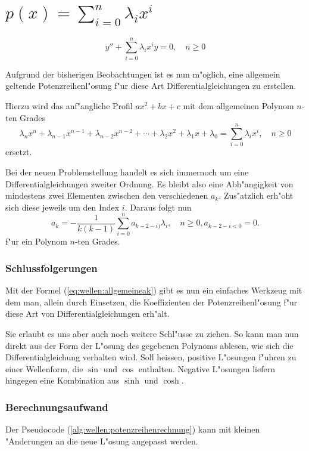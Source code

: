 \section{\texorpdfstring{$p(x) = \sum_{i=0}^{n}\lambda_ix^i$}{p(x) = summe i = 
0 
bis n lambdai xi}}

\begin{equation}
	y''+\sum_{i=0}^{n}\lambda_ix^i y=0, \quad n \ge 0
	\label{eq:wellen:allgemeinesproblem}
\end{equation}

Aufgrund der bisherigen Beobachtungen ist es nun m"oglich, eine 
allgemein geltende Potenzreihenl"osung f"ur diese Art Differentialgleichungen 
zu erstellen.

Hierzu wird das anf"angliche Profil $ax^2 + bx + c$ mit dem allgemeinen Polynom 
$n$-ten Grades
\begin{equation*}
	\lambda_nx^n + \lambda_{n-1}x^{n-1} + \lambda_{n-2}x^{n-2} + \dotsb + 
	\lambda_2x^2 + \lambda_1x + \lambda_0 = \sum_{i=0}^{n}\lambda_ix^i, \quad n 
	\ge 0
\end{equation*}
ersetzt.

Bei der neuen Problemstellung handelt es sich immernoch um eine 
Differentialgleichungen zweiter Ordnung. Es bleibt also eine Abh"angigkeit von 
mindestens zwei Elementen zwischen den verschiedenen $a_k$. Zus"atzlich erh"oht 
sich diese jeweils um den Index $i$. Daraus folgt nun
\begin{equation}
	a_k = -\frac{1}{k(k-1)}\sum_{i=0}^{n}a_{k-2-i)}\lambda_i, \quad n \ge 0, 
	a_{k-2-i < 0} =  0.
	\label{eq:wellen:allgemeineak}
\end{equation}
f"ur ein Polynom $n$-ten Grades.

\subsubsection{Schlussfolgerungen}

Mit der Formel (\ref{eq:wellen:allgemeineak}) gibt es nun ein einfaches 
Werkzeug mit dem man, allein durch Einsetzen, die Koeffizienten der 
Potenzreihenl"osung f"ur diese Art von Differentialgleichungen erh"alt.

Sie erlaubt es uns aber auch noch weitere Schl"usse zu ziehen. So kann man 
nun direkt aus der Form der L"osung des gegebenen Polynoms ablesen, wie sich 
die Differentialgleichung verhalten wird. Soll heissen, positive L"osungen 
f"uhren zu einer Wellenform, die $\sin$ und $\cos$ enthalten. Negative 
L"osungen liefern hingegen eine Kombination aus $\sinh$ und $\cosh$.

\subsubsection{Berechnungsaufwand}
Der Pseudocode (\ref{alg:wellen:potenzreihenrechnung}) kann mit kleinen 
"Anderungen an die neue L"osung angepasst werden. 







